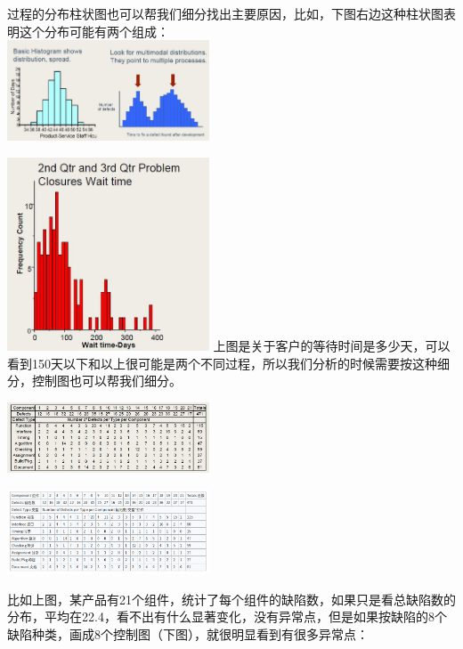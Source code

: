过程的分布柱状图也可以帮我们细分找出主要原因，比如，下图右边这种柱状图表明这个分布可能有两个组成：\\

\includegraphics[width=6cm]{DAD_p55.jpg}


\includegraphics[width=6cm]{DAD_p591.jpg}
上图是关于客户的等待时间是多少天，可以看到150天以下和以上很可能是两个不同过程，所以我们分析的时候需要按这种细分，控制图也可以帮我们细分。


\includegraphics[width=6cm]{DAD_p65.jpg}


\includegraphics[width=6cm]{Screenshotfrom2022-12-2821-23-27.png}

比如上图，某产品有21个组件，统计了每个组件的缺陷数，如果只是看总缺陷数的分布，平均在22.4，看不出有什么显著变化，没有异常点，但是如果按缺陷的8个缺陷种类，画成8个控制图（下图），就很明显看到有很多异常点：\\

